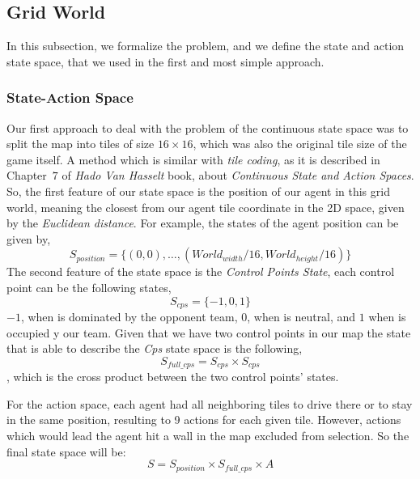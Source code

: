 \documentclass[conference]{IEEEtran}
\begin{document}
\subsection{Grid World}
In this subsection, we formalize the problem, and we define the state and action state space, that we used in the first and most simple approach.
\subsubsection{State-Action Space}
Our first approach to deal with the problem of the continuous state space was to split the map into tiles of size $16\times16$, which was also the original tile size of the game itself. A method which is similar with \textit{tile coding}, as it is described in Chapter~$7$ of \emph{Hado Van Hasselt} book, about \textit{Continuous State and Action Spaces}. So, the first feature of our state space is the position of our agent in this grid world, meaning the closest from our agent tile coordinate in the 2D space, given by the \textit{Euclidean distance}. For example, the states of the agent position can be given by, 
\begin{equation}
S_{position} = \lbrace (0,0),\ldots,(World_{width} / 16, World_{height} / 16)  \rbrace
\end{equation} 
The second feature of the state space is the \textit{Control Points State}, each control point can be the following states,
\begin{equation}
S_{cps} = \lbrace -1, 0, 1 \rbrace
\end{equation}
$-1$, when is dominated by the opponent team, $0$, when is neutral, and $1$ when is occupied y our team. Given that we have two control points in our map the state that is able to describe the \textit{Cps} state space is the following, 
\begin{equation}
S_{full\_cps} = S_{cps} \times S_{cps} 
\end{equation}
, which is the cross product between the two control points' states. 

For the action space, each agent had all neighboring tiles to drive there or to stay in the same position, resulting to 9 actions for each given tile. However, actions which would lead the agent hit a wall in the map excluded from selection. So the final state space will be:
\begin{equation}
S = S_{position} \times S_{full\_cps} \times A
\end{equation}
\end{document}

